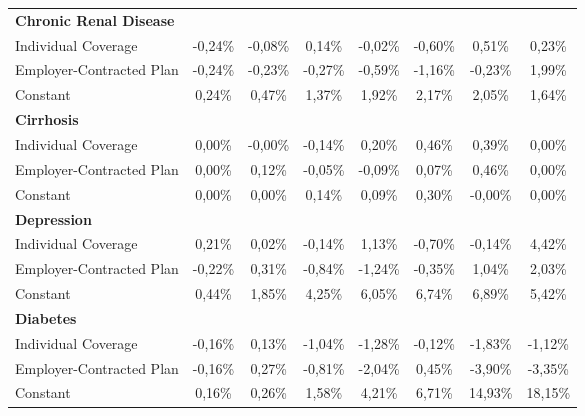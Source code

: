 \documentclass{article}
\begin{document}
\begin{table*}
{\begin{tabular}{l*{7}{c}}
\midrule
\textbf{Chronic Renal Disease}  & & & & & & & \\

Individual Coverage      & -0,24\%         & -0,08\%         &  0,14\%         & -0,02\%         & -0,60\%         &  0,51\%         &  0,23\%         \\
Employer-Contracted Plan & -0,24\%         & -0,23\%         & -0,27\%         & -0,59\%         & -1,16\%         & -0,23\%         &  1,99\%         \\
Constant                 &  0,24\%         &  0,47\%\sym{*}  &  1,37\%\sym{**} &  1,92\%\sym{***}&  2,17\%\sym{***}&  2,05\%\sym{**} &  1,64\%\sym{*}  \\

\midrule
\textbf{Cirrhosis}  & & & & & & & \\

Individual Coverage      &  0,00\%         & -0,00\%         & -0,14\%         &  0,20\%         &  0,46\%         &  0,39\%         &  0,00\%         \\
Employer-Contracted Plan &  0,00\%         &  0,12\%         & -0,05\%         & -0,09\%         &  0,07\%         &  0,46\%         &  0,00\%         \\
Constant                 &  0,00\%         &  0,00\%         &  0,14\%         &  0,09\%         &  0,30\%         & -0,00\%         &  0,00\%         \\

\midrule
\textbf{Depression}  & & & & & & & \\

Individual Coverage      &  0,21\%         &  0,02\%         & -0,14\%         &  1,13\%         & -0,70\%         & -0,14\%         &  4,42\%         \\
Employer-Contracted Plan & -0,22\%         &  0,31\%         & -0,84\%         & -1,24\%         & -0,35\%         &  1,04\%         &  2,03\%         \\
Constant                 &  0,44\%\sym{*}  &  1,85\%\sym{***}&  4,25\%\sym{***}&  6,05\%\sym{***}&  6,74\%\sym{***}&  6,89\%\sym{***}&  5,42\%\sym{***}\\

\midrule
\textbf{Diabetes}  & & & & & & & \\

Individual Coverage      & -0,16\%         &  0,13\%         & -1,04\%         & -1,28\%         & -0,12\%         & -1,83\%         & -1,12\%         \\
Employer-Contracted Plan & -0,16\%         &  0,27\%         & -0,81\%         & -2,04\%\sym{**} &  0,45\%         & -3,90\%         & -3,35\%         \\
Constant                 &  0,16\%         &  0,26\%\sym{*}  &  1,58\%\sym{***}&  4,21\%\sym{***}&  6,71\%\sym{***}& 14,93\%\sym{***}& 18,15\%\sym{***}\\


\end{tabular}}
\end{table*}
\end{document}
